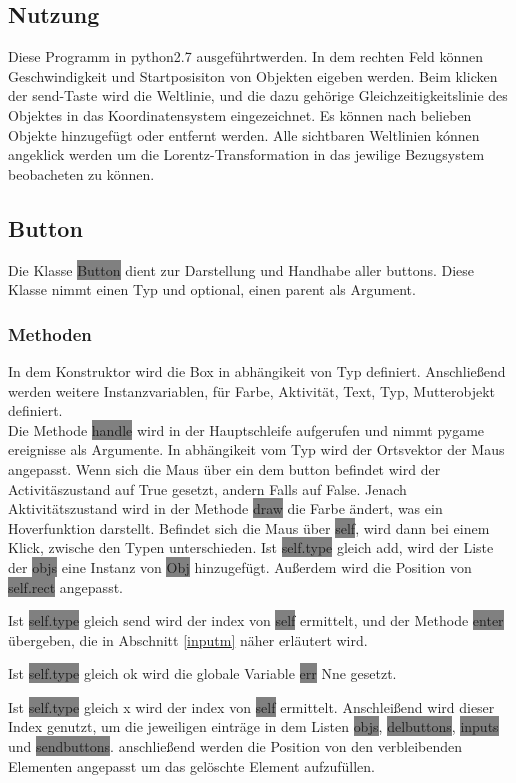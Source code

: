 \documentclass[12pt]{article}
\begin{document}
\subsection{Nutzung}
Diese Programm in python2.7 ausgeführtwerden.
In dem rechten Feld können Geschwindigkeit und Startposisiton von Objekten eigeben werden.
Beim klicken der send-Taste wird die Weltlinie, und die dazu gehörige Gleichzeitigkeitslinie des Objektes in das Koordinatensystem eingezeichnet.
Es können nach belieben Objekte hinzugefügt oder entfernt werden.
Alle sichtbaren Weltlinien kónnen angeklick werden um die Lorentz-Transformation in das jewilige Bezugsystem beobacheten zu können.
\subsection{Button}
Die Klasse \colorbox{gray}{Button} dient zur Darstellung und Handhabe aller buttons.
Diese Klasse nimmt einen Typ und optional, einen parent als Argument.
\subsubsection{Methoden}
In dem Konstruktor wird die Box in abhängikeit von Typ definiert.
Anschließend werden weitere Instanzvariablen, für Farbe, Aktivität, Text, Typ, Mutterobjekt definiert.
\\

Die Methode \colorbox{gray}{handle} wird in der Hauptschleife aufgerufen und nimmt pygame ereignisse als Argumente.
In abhängikeit vom Typ wird der Ortsvektor der Maus angepasst.
Wenn sich die Maus über ein dem button befindet wird der Activitäszustand auf True gesetzt, andern Falls auf False.
Jenach Aktivitätszustand wird in der Methode \colorbox{gray}{draw} die Farbe ändert, was ein Hoverfunktion darstellt.
Befindet sich die Maus über \colorbox{gray}{self}, wird dann bei einem Klick, zwische den Typen unterschieden.
Ist \colorbox{gray}{self.type} gleich add, wird der Liste der \colorbox{gray}{objs} eine Instanz von \colorbox{gray}{Obj} hinzugefügt.
Außerdem wird die Position von \colorbox{gray}{self.rect} angepasst.

Ist \colorbox{gray}{self.type} gleich send wird der index von \colorbox{gray}{self} ermittelt, und der Methode \colorbox{gray}{enter} übergeben, die in Abschnitt \ref{inputm} näher erläutert wird.

Ist \colorbox{gray}{self.type} gleich ok wird die globale Variable \colorbox{gray}{err} Nne gesetzt.

Ist \colorbox{gray}{self.type} gleich x wird der index von \colorbox{gray}{self} ermittelt.
Anschleißend wird dieser Index genutzt, um die jeweiligen einträge in dem Listen \colorbox{gray}{objs}, \colorbox{gray}{delbuttons}, \colorbox{gray}{inputs} und \colorbox{gray}{sendbuttons}.
anschließend werden die Position von den verbleibenden Elementen angepasst um das gelöschte Element aufzufüllen.
\\
\end{document}

